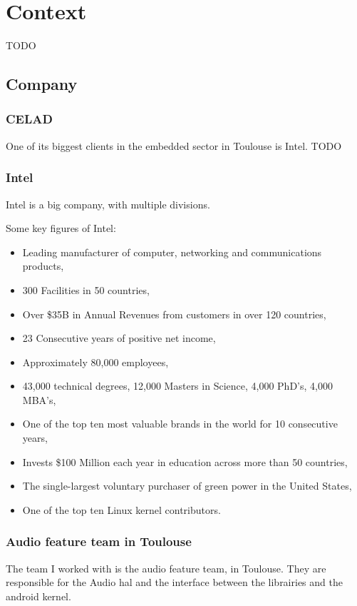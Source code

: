 \chapter{Context}\label{chap:context}

\begin{sectionIntro}
    TODO
\end{sectionIntro}

\section{Company}

\subsection{CELAD}
One of its biggest clients in the embedded sector in Toulouse is Intel.
TODO

\subsection{Intel}
Intel is a big company, with multiple divisions.

Some key figures of Intel:
\begin{itemize}
\item Leading manufacturer of computer, networking and communications
  products,
  \item 300 Facilities in 50 countries,
  \item Over \$35B in Annual Revenues from customers in over 120
    countries,
\item 23 Consecutive years of positive net income,
\item Approximately 80,000 employees,
\item 43,000 technical degrees, 12,000 Masters in Science, 4,000
  PhD’s, 4,000 MBA’s,
  \item One of the top ten most valuable brands in the world for 10
    consecutive years,
\item Invests \$100 Million each year in education across more than 50
  countries,
  \item The single-largest voluntary purchaser of green power in the
    United States,
\item One of the top ten Linux \gls{kernel} contributors.
\end{itemize}

\subsection{Audio feature team in Toulouse}
The team I worked with is the audio feature team, in Toulouse.
They are responsible for the Audio \gls{hal} and the interface between the
librairies and the \gls{android} \gls{kernel}.


